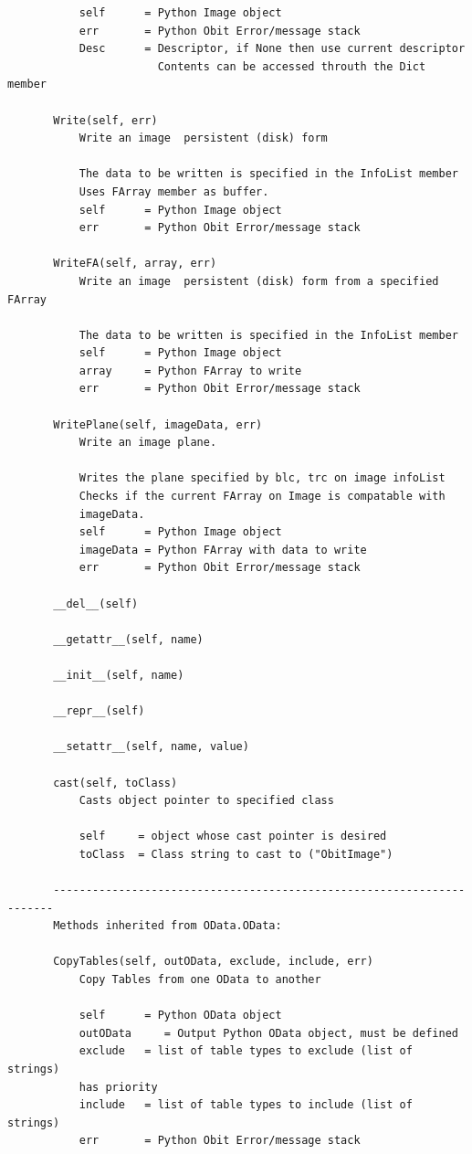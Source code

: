 \documentclass[11pt]{report}
\begin{document}
\begin{verbatim}
           self      = Python Image object
           err       = Python Obit Error/message stack
           Desc      = Descriptor, if None then use current descriptor
                       Contents can be accessed throuth the Dict member
       
       Write(self, err)
           Write an image  persistent (disk) form
           
           The data to be written is specified in the InfoList member
           Uses FArray member as buffer.
           self      = Python Image object
           err       = Python Obit Error/message stack
       
       WriteFA(self, array, err)
           Write an image  persistent (disk) form from a specified FArray
           
           The data to be written is specified in the InfoList member
           self      = Python Image object
           array     = Python FArray to write
           err       = Python Obit Error/message stack
       
       WritePlane(self, imageData, err)
           Write an image plane.
           
           Writes the plane specified by blc, trc on image infoList
           Checks if the current FArray on Image is compatable with
           imageData.
           self      = Python Image object
           imageData = Python FArray with data to write
           err       = Python Obit Error/message stack
       
       __del__(self)

       __getattr__(self, name)
       
       __init__(self, name)
       
       __repr__(self)
       
       __setattr__(self, name, value)
       
       cast(self, toClass)
           Casts object pointer to specified class
           
           self     = object whose cast pointer is desired
           toClass  = Class string to cast to ("ObitImage")
       
       ----------------------------------------------------------------------
       Methods inherited from OData.OData:
       
       CopyTables(self, outOData, exclude, include, err)
           Copy Tables from one OData to another
           
           self      = Python OData object
           outOData     = Output Python OData object, must be defined
           exclude   = list of table types to exclude (list of strings)
           has priority
           include   = list of table types to include (list of strings)
           err       = Python Obit Error/message stack
       

\end{verbatim}
\end{document}
